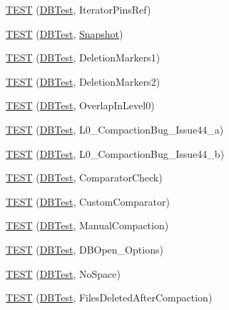 \begin{DoxyCompactItemize}
\item 
\hyperlink{namespaceleveldb_a899f7415195fa4d25d801246cdec721d}{T\+E\+S\+T} (\hyperlink{classleveldb_1_1_d_b_test}{D\+B\+Test}, Iterator\+Pins\+Ref)
\item 
\hyperlink{namespaceleveldb_ab09998970d1ace06b8082f49da0444f5}{T\+E\+S\+T} (\hyperlink{classleveldb_1_1_d_b_test}{D\+B\+Test}, \hyperlink{classleveldb_1_1_snapshot}{Snapshot})
\item 
\hyperlink{namespaceleveldb_a216168df3713bb71f35038d91b5224f0}{T\+E\+S\+T} (\hyperlink{classleveldb_1_1_d_b_test}{D\+B\+Test}, Deletion\+Markers1)
\item 
\hyperlink{namespaceleveldb_a4188787b0b1e1e25475a2983374065b6}{T\+E\+S\+T} (\hyperlink{classleveldb_1_1_d_b_test}{D\+B\+Test}, Deletion\+Markers2)
\item 
\hyperlink{namespaceleveldb_a4fa4ffaab998ba44a1745937c1e9c55c}{T\+E\+S\+T} (\hyperlink{classleveldb_1_1_d_b_test}{D\+B\+Test}, Overlap\+In\+Level0)
\item 
\hyperlink{namespaceleveldb_a46665ff2f4f9bd25167f82d3be16f8b2}{T\+E\+S\+T} (\hyperlink{classleveldb_1_1_d_b_test}{D\+B\+Test}, L0\+\_\+\+Compaction\+Bug\+\_\+\+Issue44\+\_\+a)
\item 
\hyperlink{namespaceleveldb_a727df67090c63a0ca4b2effdc90a3da1}{T\+E\+S\+T} (\hyperlink{classleveldb_1_1_d_b_test}{D\+B\+Test}, L0\+\_\+\+Compaction\+Bug\+\_\+\+Issue44\+\_\+b)
\item 
\hyperlink{namespaceleveldb_a5cd6c2754610c66f4dd998874482c80b}{T\+E\+S\+T} (\hyperlink{classleveldb_1_1_d_b_test}{D\+B\+Test}, Comparator\+Check)
\item 
\hyperlink{namespaceleveldb_a38772a8b86ea7658430b1fa2f1a5d83e}{T\+E\+S\+T} (\hyperlink{classleveldb_1_1_d_b_test}{D\+B\+Test}, Custom\+Comparator)
\item 
\hyperlink{namespaceleveldb_a34a511836c47efe81202280115290934}{T\+E\+S\+T} (\hyperlink{classleveldb_1_1_d_b_test}{D\+B\+Test}, Manual\+Compaction)
\item 
\hyperlink{namespaceleveldb_a88d6fdcb16ed4edc65da40f383e6f23b}{T\+E\+S\+T} (\hyperlink{classleveldb_1_1_d_b_test}{D\+B\+Test}, D\+B\+Open\+\_\+\+Options)
\item 
\hyperlink{namespaceleveldb_a11f56de4abca34391c0e60f311262b65}{T\+E\+S\+T} (\hyperlink{classleveldb_1_1_d_b_test}{D\+B\+Test}, No\+Space)
\item 
\hyperlink{namespaceleveldb_a47755684dc15db851e0174ea9475e97c}{T\+E\+S\+T} (\hyperlink{classleveldb_1_1_d_b_test}{D\+B\+Test}, Files\+Deleted\+After\+Compaction)

\end{DoxyCompactItemize}
